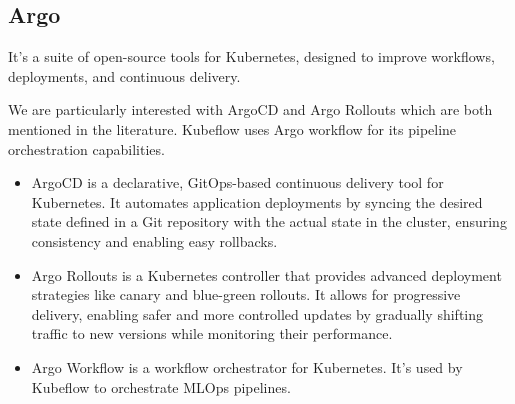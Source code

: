 


\subsection{Argo}\label{subsec:argo}\cite{argo}
It's a suite of open-source tools for Kubernetes, designed to improve workflows, deployments, and continuous delivery.

We are particularly interested with ArgoCD and Argo Rollouts which are both mentioned in the literature\cite{inproceedings}.
Kubeflow uses Argo workflow for its pipeline orchestration capabilities.

\begin{itemize}
    \item ArgoCD
     is a declarative, GitOps-based continuous delivery tool for Kubernetes.
     It automates application deployments by syncing the desired state
     defined in a Git repository with the actual state in the cluster,
     ensuring consistency and enabling easy rollbacks.

    \item Argo Rollouts
     is a Kubernetes controller that provides advanced deployment strategies
     like canary and blue-green rollouts.
     It allows for progressive delivery, enabling safer and more controlled updates by gradually
     shifting traffic to new versions while monitoring their performance.

    \item Argo Workflow
    is a workflow orchestrator for Kubernetes.
    It's used by Kubeflow to orchestrate MLOps pipelines.
\end{itemize}

